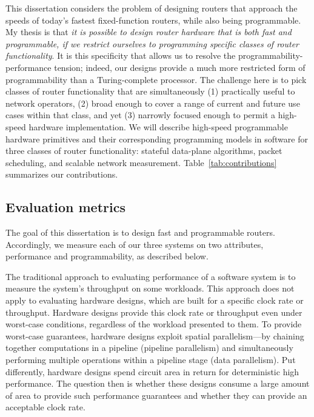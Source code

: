 This dissertation considers the problem of designing routers that approach the
speeds of today's fastest fixed-function routers, while also being
programmable. My thesis is that {\em it is possible to design router hardware
that is both fast and programmable, if we restrict ourselves to programming
specific classes of router functionality}. It is this specificity that allows
us to resolve the programmability-performance tension; indeed, our designs
provide a much more restricted form of programmability than a Turing-complete
processor.  The challenge here is to pick classes of router functionality that
are simultaneously (1) practically useful to network operators, (2) broad
enough to cover a range of current and future use cases within that class, and
yet (3) narrowly focused enough to permit a high-speed hardware implementation.
We will describe high-speed programmable hardware primitives and their
corresponding programming models in software for three classes of router
functionality: stateful data-plane algorithms, packet scheduling, and scalable
network measurement.  Table~\ref{tab:contributions} summarizes our
contributions.

\subsection{Evaluation metrics}
\label{ss:eval_metrics}

The goal of this dissertation is to design fast and programmable routers.
Accordingly, we measure each of our three systems on two attributes,
performance and programmability, as described below.

The traditional approach to evaluating performance of a software system is to
measure the system's throughput on some workloads. This approach does not apply
to evaluating hardware designs, which are built for a specific clock rate or
throughput. Hardware designs provide this clock rate or throughput even under
worst-case conditions, regardless of the workload presented to them. To provide
worst-case guarantees, hardware designs exploit spatial parallelism---by
chaining together computations in a pipeline (pipeline parallelism) and
simultaneously performing multiple operations within a pipeline stage (data
parallelism).  Put differently, hardware designs spend circuit area in return
for deterministic  high performance. The question then is whether these designs
consume a large amount of area to provide such performance guarantees and
whether they can provide an acceptable clock rate.
 
